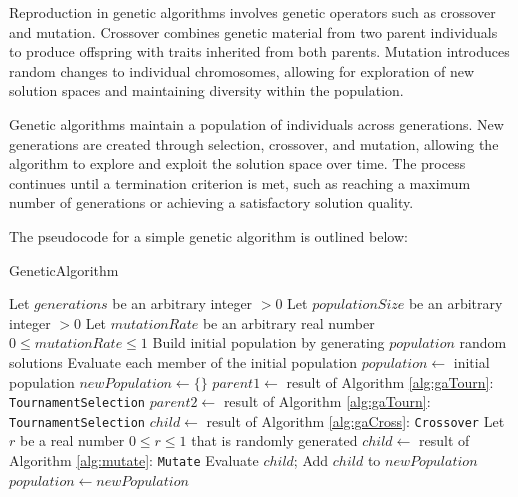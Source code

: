 \documentclass[11pt]{report}
\begin{document}
        Reproduction in genetic algorithms involves genetic operators such as crossover and mutation. Crossover combines genetic material from two parent individuals to produce offspring with traits inherited from both parents. Mutation introduces random changes to individual chromosomes, allowing for exploration of new solution spaces and maintaining diversity within the population.
        
        Genetic algorithms maintain a population of individuals across generations. New generations are created through selection, crossover, and mutation, allowing the algorithm to explore and exploit the solution space over time. The process continues until a termination criterion is met, such as reaching a maximum number of generations or achieving a satisfactory solution quality.
        
        The pseudocode for a simple genetic algorithm is outlined below:
        
        \begin{algorithm}[!h]
            \DontPrintSemicolon
            \caption{GeneticAlgorithm}
            \label{alg:gaOptimize}
            Let $generations$ be an arbitrary integer $> 0$\;
            Let $populationSize$ be an arbitrary integer $> 0$\;
            Let $mutationRate$ be an arbitrary real number $0 \leq mutationRate \leq 1$\;
            Build initial population by generating $population$ random solutions\;
            {
                Evaluate each member of the initial population\; 
            }
            $population \gets $ initial population\;
            {
                $newPopulation \gets \{\}$\;
                {
                    $parent1 \gets $ result of Algorithm \ref{alg:gaTourn}: \texttt{TournamentSelection}\;
                    $parent2 \gets $ result of Algorithm \ref{alg:gaTourn}: \texttt{TournamentSelection}\;
                    $child \gets$ result of Algorithm \ref{alg:gaCross}: \texttt{Crossover}\;
                    Let $r$ be a real number $0\leq r \leq 1$ that is randomly generated\;
                    {
                        $child\gets $ result of Algorithm \ref{alg:mutate}: \texttt{Mutate}\;
                    }
                    Evaluate $child$;
                    Add $child$ to $newPopulation$\;
                }
                $population \gets newPopulation$\;
            }
        \end{algorithm}
        
\end{document}
